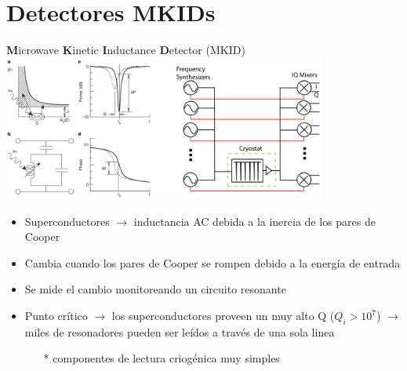 \documentclass[ignorenonframetext,12pt]{beamer}
\begin{document}
\section{Detectores MKIDs}
\begin{frame}{\textbf{M}icrowave \textbf{K}inetic \textbf{I}nductance
	\textbf{D}etector (MKID)}
	\centering
	\qquad \includegraphics[width=0.8\textwidth]{concepto_mkid1}
	\begin{itemize}
		\item \footnotesize{Superconductores $\to$ inductancia AC debida a la
			inercia de los pares de Cooper}
		\item Cambia cuando los pares de Cooper se rompen debido a la
			energía de entrada
		\item Se mide el cambio monitoreando un circuito resonante
		\item Punto crítico $\to$ los \alert{superconductores proveen un muy
			alto Q} ($Q_i > 10^7$) $\to$ miles de resonadores
			pueden ser leídos a través de una sola linea 
			\begin{itemize}
				\item[*] \scriptsize{{\color{blue}componentes de lectura criogénica muy
					simples}}
			\end{itemize}
	\end{itemize}

\end{frame}
\end{document}
